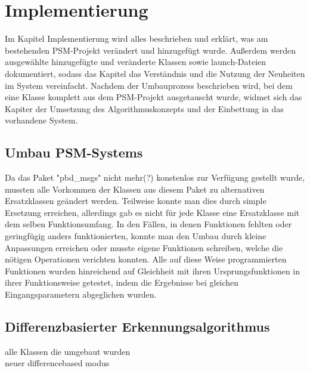 \chapter{Implementierung}\label{ch:implementierung}

Im Kapitel Implementierung wird alles beschrieben und erklärt, was am bestehenden PSM-Projekt verändert und hinzugefügt wurde. Außerdem werden ausgewählte hinzugefügte und veränderte Klassen sowie launch-Dateien dokumentiert, sodass das Kapitel das Verständnis und die Nutzung der Neuheiten im System vereinfacht. Nachdem der Umbauprozess beschrieben wird, bei dem eine Klasse komplett aus dem PSM-Projekt ausgetauscht wurde, widmet sich das Kapiter der Umsetzung des Algorithmuskonzepts und der Einbettung in das vorhandene System.

\section{Umbau PSM-Systems}
Da das Paket "pbd\_msgs" nicht mehr(?) konstenlos zur Verfügung gestellt wurde, mussten alle Vorkommen der Klassen aus diesem Paket zu alternativen Ersatzklassen geändert werden. Teilweise konnte man dies durch simple Ersetzung erreichen, allerdings gab es nicht für jede Klasse eine Ersatzklasse mit dem selben Funktionsumfang. In den Fällen, in denen Funktionen fehlten oder geringfügig anders funktionierten, konnte man den Umbau durch kleine Anpassungen erreichen oder musste eigene Funktionen schreiben, welche die nötigen Operationen verichten konnten. Alle auf diese Weise programmierten Funktionen wurden hinreichend auf Gleichheit mit ihren Ursprungsfunktionen in ihrer Funktionsweise getestet, indem die Ergebnisse bei gleichen Eingangsparametern abgeglichen wurden.

\section{Differenzbasierter Erkennungsalgorithmus}

alle Klassen die umgebaut wurden\\
neuer differencebased modus \\



\begin{deprecated}
\cite{davis93}


\end{deprecated}
